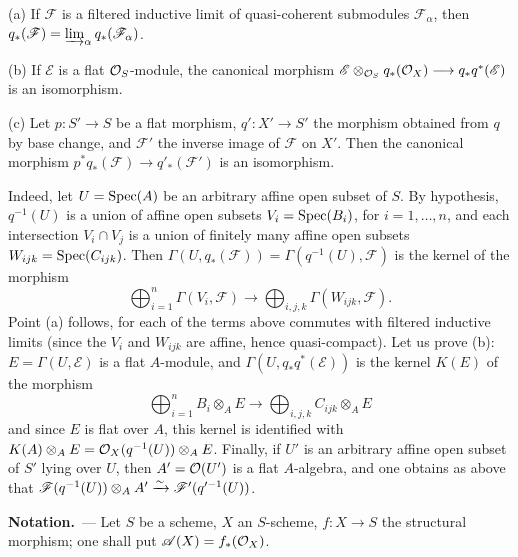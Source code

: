 (a) If $\mathscr F$ is a filtered inductive limit of quasi-coherent submodules $\mathscr F_\alpha$, then $q_*(\mathscr F)=\varinjlim_\alpha q_*(\mathscr F_\alpha)$.

(b) If $\mathscr E$ is a flat $\mathcal{O}_S$-module, the canonical morphism $\mathscr E\otimes_{\mathcal{O}_S}q_*(\mathcal{O}_X)\longrightarrow q_*q^*(\mathscr E)$ is an isomorphism.

(c) Let $p:S'\to S$ be a flat morphism, $q':X'\to S'$ the morphism obtained from $q$ by base change, and $\mathscr F'$ the inverse image of $\mathscr F$ on $X'$. Then the canonical morphism $p^*q_*(\mathscr F)\to q'_*(\mathscr F')$ is an isomorphism.

Indeed, let $U=\operatorname{Spec}(A)$ be an arbitrary affine open subset of $S$. By hypothesis, $q^{-1}(U)$ is a union of affine open subsets $V_i=\operatorname{Spec}(B_i)$, for $i=1,\ldots,n$, and each intersection $V_i\cap V_j$ is a union of finitely many affine open subsets $W_{ijk}=\operatorname{Spec}(C_{ijk})$. Then $\Gamma(U,q_*(\mathscr F))=\Gamma(q^{-1}(U),\mathscr F)$ is the kernel of the morphism
\[
\bigoplus_{i=1}^n\Gamma(V_i,\mathscr F)\to\bigoplus_{i,j,k}\Gamma(W_{ijk},\mathscr F).
\]
Point (a) follows, for each of the terms above commutes with filtered inductive limits (since the $V_i$ and $W_{ijk}$ are affine, hence quasi-compact). Let us prove (b): $E=\Gamma(U,\mathscr E)$ is a flat $A$-module, and $\Gamma(U,q_*q^*(\mathscr E))$ is the kernel $K(E)$ of the morphism
\[
\bigoplus_{i=1}^n B_i\otimes_A E\to\bigoplus_{i,j,k}C_{ijk}\otimes_A E
\]
and since $E$ is flat over $A$, this kernel is identified with $K(A)\otimes_A E=\mathcal{O}_X(q^{-1}(U))\otimes_A E$. Finally, if $U'$ is an arbitrary affine open subset of $S'$ lying over $U$, then $A'=\mathcal{O}(U')$ is a flat $A$-algebra, and one obtains as above that $\mathscr F(q^{-1}(U))\otimes_A A'\xrightarrow{\sim}\mathscr F'(q'^{-1}(U))$.

\par\medskip\noindent\textbf{Notation.}\ --- Let $S$ be a scheme, $X$ an $S$-scheme, $f:X\to S$ the structural morphism; one shall put $\mathscr A(X)=f_*(\mathcal{O}_X)$.

